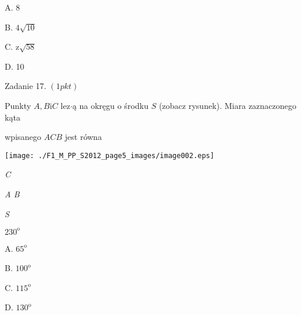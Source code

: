 \documentclass[a4paper,12pt]{article}
\begin{document}
A. 8

B. $4\sqrt{10}$

C. $\mathrm{z}\sqrt{58}$

D. 10

Zadanie 17. $(1pkt)$

Punkty $A, B \mathrm{i} C$ lez$\cdot$ą na okręgu o środku $S$ (zobacz rysunek). Miara zaznaczonego kąta

wpisanego $ACB$ jest równa
\begin{center}
\texttt{[image: ./F1\_M\_PP\_S2012\_page5\_images/image002.eps]}
\end{center}
{\it C}

{\it A  B}

{\it S}

$230^{\mathrm{o}}$

A. $65^{\mathrm{o}}$

B. $100^{\mathrm{o}}$

C. $115^{\mathrm{o}}$

D. $130^{\mathrm{o}}$
\end{document}
